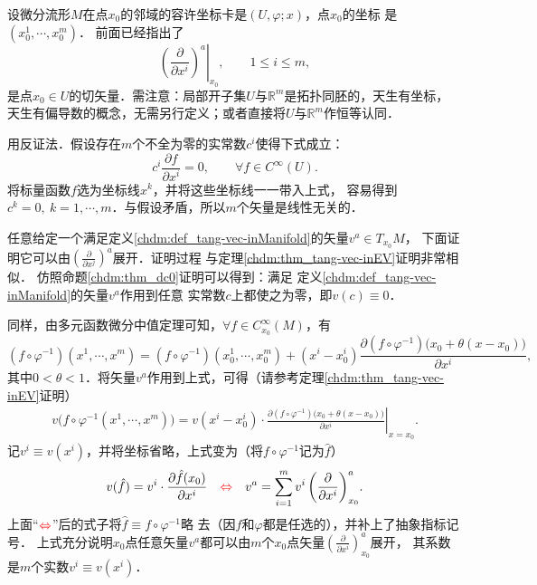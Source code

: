 
设微分流形$M$在点$x_0$的邻域的容许坐标卡是$(U,\varphi;x)$，点$x_0$的坐标
是$(x^1_0,\cdots,x^m_0)$．%
前面已经指出了
\begin{equation}
    \left. \left(\frac{\partial }{\partial x^i}\right)^a \right|_{x_0}, \qquad 1\leqslant i \leqslant m,
\end{equation}
是点$x_{0}\in U$的切矢量．需注意：局部开子集$U$与$\mathbb{R}^m$是拓扑同胚的，天生有坐标，
天生有偏导数的概念，无需另行定义；或者直接将$U$与$\mathbb{R}^m$作恒等认同．

用反证法．假设存在$m$个不全为零的实常数$c^i$使得下式成立：
\begin{equation}
    c^i \frac{\partial f}{\partial x^i}  =0, \qquad \forall f \in C^\infty(U).
\end{equation}
将标量函数$f$选为坐标线$x^k$，并将这些坐标线一一带入上式，
容易得到$c^k=0,\ k=1,\cdots,m$．与假设矛盾，所以$m$个矢量是线性无关的．

任意给定一个满足定义\ref{chdm:def_tang-vec-inManifold}的矢量$v^a\in T_{x_0}M$，
下面证明它可以由$(\frac{\partial }{\partial x^j})^a$展开．证明过程
与定理\ref{chdm:thm_tang-vec-inEV}证明非常相似．
仿照命题\ref{chdm:thm_dc0}证明可以得到：满足
定义\ref{chdm:def_tang-vec-inManifold}的矢量$v^a$作用到任意
实常数$c$上都使之为零，即$v(c)\equiv 0$．

同样，由多元函数微分中值定理可知，$\forall f\in C_{x_0}^\infty(M)$，有
\setlength{\mathindent}{0 em}
\begin{equation*} %
    (f \circ\varphi^{-1})(x^1,\cdots,x^m)=(f \circ\varphi^{-1})(x^1_0,\cdots,x^m_0)+ 
    (x^i-x^i_0) \frac{\partial (f \circ\varphi^{-1}) \bigl(x_0+\theta(x-x_0) \bigr)}{\partial x^i},
\end{equation*}\setlength{\mathindent}{2 em}
其中$0<\theta<1$．将矢量$v^a$作用到上式，可得（请参考定理\ref{chdm:thm_tang-vec-inEV}证明）
\begin{align*} %
    v\bigl( f \circ\varphi^{-1} (x^1,\cdots,x^m)\bigr) = v(x^i-x^i_0) \cdot      \left.
     \frac{\partial (f \circ\varphi^{-1}) \bigl(x_0+\theta(x-x_0) \bigr)}{\partial x^i}\right|_{x=x_0}.
\end{align*}
记$v^i\equiv v(x^i)$，并将坐标省略，上式变为（将$f \circ\varphi^{-1}$记为$\hat{f}$）
\begin{equation}\label{chdm:eqn_v-expand-on-natural-bases}
    v( \hat{f} ) = v^i \cdot 
    \frac{\partial \hat{f} (x_0)}{\partial x^i}
    {\quad \color{red}\Leftrightarrow \quad }
    v^a = \sum_{i=1}^{m} { v^i \left(\frac{\partial }{\partial x^i}\right)^a_{x_0} }.
\end{equation}
上面“${ \color{red}\Leftrightarrow }$”后的式子将$\hat{f}\equiv f \circ\varphi^{-1} $略
去（因$f$和$\varphi$都是任选的），并补上了抽象指标记号．
上式充分说明$x_0$点任意矢量$v^a$都可以由$m$个$x_0$点矢量$(\frac{\partial }{\partial x^i})^a_{x_0} $展开，
其系数是$m$个实数$v^i\equiv v(x^i)$．

